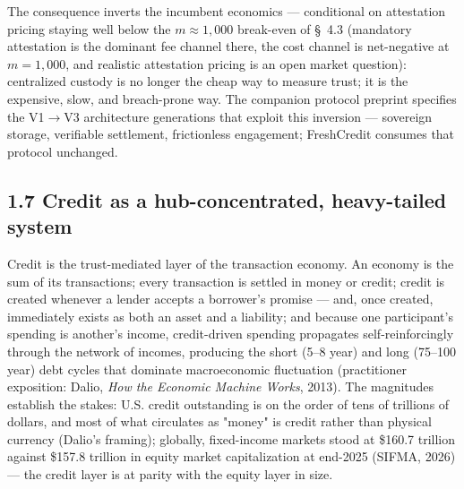 \documentclass[11pt,twocolumn]{article}
\begin{document}
The consequence inverts the incumbent economics --- conditional on attestation pricing staying well below the $m \approx 1{,}000$ break-even of \S~4.3 (mandatory attestation is the dominant fee channel there, the cost channel is net-negative at $m = 1{,}000$, and realistic attestation pricing is an open market question): centralized custody is no longer the cheap way to measure trust; it is the expensive, slow, and breach-prone way. The companion protocol preprint specifies the V1$\rightarrow$V3 architecture generations that exploit this inversion --- sovereign storage, verifiable settlement, frictionless engagement; FreshCredit consumes that protocol unchanged.

\subsection*{1.7 Credit as a hub-concentrated, heavy-tailed system}

Credit is the trust-mediated layer of the transaction economy. An economy is the sum of its transactions; every transaction is settled in money or credit; credit is created whenever a lender accepts a borrower's promise --- and, once created, immediately exists as both an asset and a liability; and because one participant's spending is another's income, credit-driven spending propagates self-reinforcingly through the network of incomes, producing the short (5--8 year) and long (75--100 year) debt cycles that dominate macroeconomic fluctuation (practitioner exposition: Dalio, \emph{How the Economic Machine Works}, 2013). The magnitudes establish the stakes: U.S. credit outstanding is on the order of tens of trillions of dollars, and most of what circulates as "money" is credit rather than physical currency (Dalio's framing); globally, fixed-income markets stood at \$160.7 trillion against \$157.8 trillion in equity market capitalization at end-2025 (SIFMA, 2026) --- the credit layer is at parity with the equity layer in size.
\end{document}
